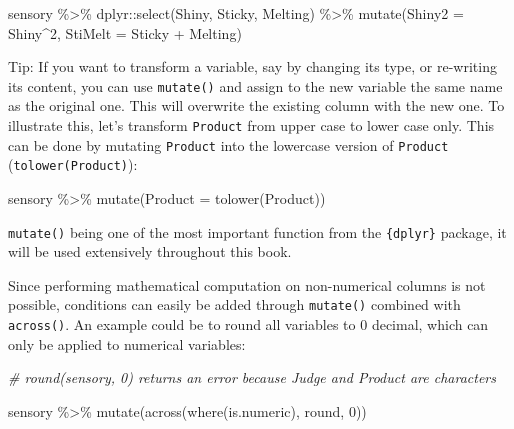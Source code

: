 \documentclass[
]{book}
\newenvironment{Shaded}{\begin{snugshade}}{\end{snugshade}}
\newcommand{\AttributeTok}[1]{\textcolor[rgb]{0.77,0.63,0.00}{#1}}
\newcommand{\CommentTok}[1]{\textcolor[rgb]{0.56,0.35,0.01}{\textit{#1}}}
\newcommand{\DecValTok}[1]{\textcolor[rgb]{0.00,0.00,0.81}{#1}}
\newcommand{\FunctionTok}[1]{\textcolor[rgb]{0.00,0.00,0.00}{#1}}
\newcommand{\NormalTok}[1]{#1}
\newcommand{\SpecialCharTok}[1]{\textcolor[rgb]{0.00,0.00,0.00}{#1}}
\begin{document}
\begin{Shaded}
\begin{Highlighting}[]
\NormalTok{sensory }\SpecialCharTok{\%\textgreater{}\%} 
\NormalTok{  dplyr}\SpecialCharTok{::}\FunctionTok{select}\NormalTok{(Shiny, Sticky, Melting) }\SpecialCharTok{\%\textgreater{}\%} 
  \FunctionTok{mutate}\NormalTok{(}\AttributeTok{Shiny2 =}\NormalTok{ Shiny}\SpecialCharTok{\^{}}\DecValTok{2}\NormalTok{, }\AttributeTok{StiMelt =}\NormalTok{ Sticky }\SpecialCharTok{+}\NormalTok{ Melting)}
\end{Highlighting}
\end{Shaded}

Tip: If you want to transform a variable, say by changing its type, or re-writing its content, you can use \texttt{mutate()} and assign to the new variable the same name as the original one. This will overwrite the existing column with the new one. To illustrate this, let's transform \texttt{Product} from upper case to lower case only. This can be done by mutating \texttt{Product} into the lowercase version of \texttt{Product} (\texttt{tolower(Product)}):

\begin{Shaded}
\begin{Highlighting}[]
\NormalTok{sensory }\SpecialCharTok{\%\textgreater{}\%} 
  \FunctionTok{mutate}\NormalTok{(}\AttributeTok{Product =} \FunctionTok{tolower}\NormalTok{(Product))}
\end{Highlighting}
\end{Shaded}

\texttt{mutate()} being one of the most important function from the \texttt{\{dplyr\}} package, it will be used extensively throughout this book.

Since performing mathematical computation on non-numerical columns is not possible, conditions can easily be added through \texttt{mutate()} combined with \texttt{across()}. An example could be to round all variables to 0 decimal, which can only be applied to numerical variables:

\begin{Shaded}
\begin{Highlighting}[]
\CommentTok{\# round(sensory, 0) returns an error because Judge and Product are characters}

\NormalTok{sensory }\SpecialCharTok{\%\textgreater{}\%} 
  \FunctionTok{mutate}\NormalTok{(}\FunctionTok{across}\NormalTok{(}\FunctionTok{where}\NormalTok{(is.numeric), round, }\DecValTok{0}\NormalTok{))}
\end{Highlighting}
\end{Shaded}
\end{document}
